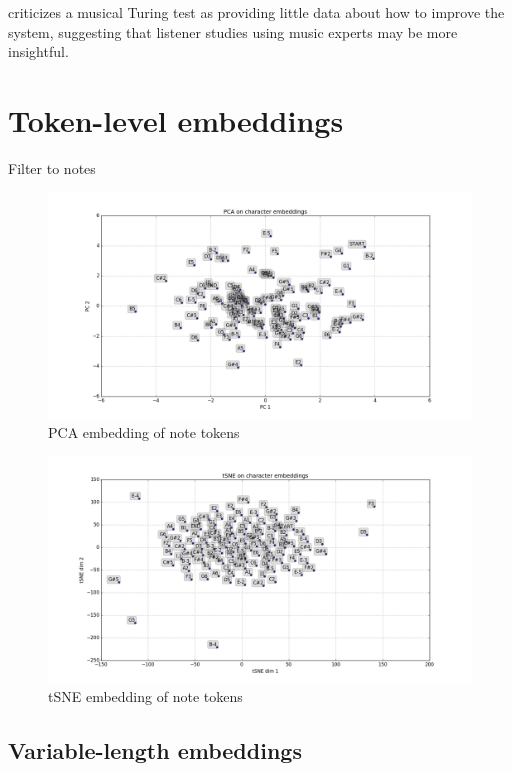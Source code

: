 \cite{ariza2009interrogator} criticizes a musical Turing test as providing little data about
how to improve the system, suggesting that listener studies using music experts
may be more insightful.


\section{Token-level embeddings}


Filter to notes

\begin{figure}[tb]
    \centering
    \includegraphics[width=1.0\linewidth]{PCA-notes.png}
    \caption{PCA embedding of note tokens}
    \label{fig:pca-notes}
\end{figure}

\begin{figure}[tb]
    \centering
    \includegraphics[width=1.0\linewidth]{tSNE-notes.png}
    \caption{tSNE embedding of note tokens}
    \label{fig:tsne-notes}
\end{figure}

\subsection{Variable-length embeddings}

